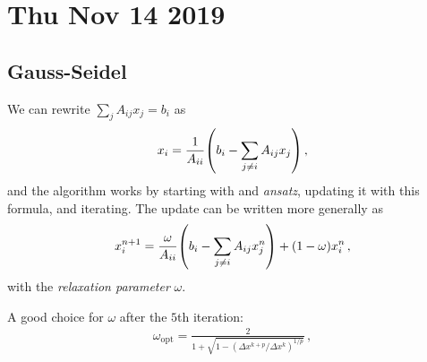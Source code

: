 \documentclass[main.tex]{subfiles}
\begin{document}
\section*{Thu Nov 14 2019}

\subsection{Gauss-Seidel}

We can rewrite \(\sum _{j} A_{ij} x_{j} = b_i\) as 
%
\begin{align}
  x_{i} = \frac{1}{A_{ii}} \qty(b_{i} - \sum _{j \neq i} A_{ij}x_{j}) 
\,,
\end{align}
%
and the algorithm works by starting with and \emph{ansatz}, updating it with this formula, and iterating.
The update can be written more generally as 
%
\begin{align}
    x_{i}^{n+1} = \frac{\omega }{A_{ii}} \qty(b_{i} - \sum _{j \neq i} A_{ij}x_{j}^{n}) + (1-\omega) x_{i}^{n} 
  \,,
  \end{align}
%
with the \emph{relaxation parameter} \(\omega \).

A good choice for \(\omega \) after the \(5\)th iteration: 
%
\begin{align}
  \omega _{\text{opt}} = \frac{2}{1 + \sqrt{1- (\Delta x^{k+p} / \Delta x^{k})^{1/p}}}
\,,
\end{align}
%
\end{document}
